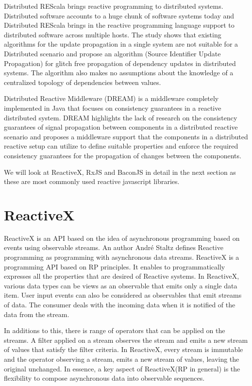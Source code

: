 Distributed REScala\cite{Drechsler:2014:DRU:2660193.2660240} brings reactive programming to distributed systems. Distributed software accounts to a huge chunk of software systems today and Distributed REScala brings in the reactive programming language support to distributed software across multiple hosts. The study\cite{Drechsler:2014:DRU:2660193.2660240} shows that existing algorithms for the update propagation in a single system are not suitable for a Distributed scenario and propose an algorithm (Source Identifier Update Propagation) for glitch free propagation of dependency updates in distributed systems. The algorithm also makes no assumptions about the knowledge of a centralized topology of dependencies between values.

Distributed Reactive Middleware (DREAM) \cite{Margara:2014:WDD:2611286.2611290} is a middleware completely implemented in Java that focuses on consistency guarantees in a reactive distributed system. DREAM highlights the lack of research on the consistency guarantees of signal propagation between components in a distributed reactive scenario and proposes a middleware support that the components in a distributed reactive setup can utilize to define suitable properties and enforce the required consistency guarantees for the propagation of changes between the components.

We will look at ReactiveX, RxJS and BaconJS in detail in the next section as these are most commonly used reactive javascript libraries.

\section{ReactiveX}
ReactiveX is an API based on the idea of asynchronous programming based on events using observable streams. An author André Staltz defines Reactive programming as programming with asynchronous data streams\cite{introToRP}. ReactiveX is a programming API based on RP principles. It enables to programmatically expresses \cite{Doblander:2015:GEA:2675743.2776757} all the properties that are desired of Reactive systems\cite{reactiveManifesto}. In ReactiveX, various data types can be views as an observable that emits only a single data item. User input events can also be considered as observables that emit streams of data. The consumer deals with the incoming data when it is notified of the data from the stream.

In additions to this, there is range of operators that can be applied on the streams. A filter applied on a stream observes the stream and emits a new stream of values that satisfy the filter criteria. In ReactiveX, every stream is immutable and the operator observing a stream, emits a new stream of values, leaving the original unchanged. In essence, a key aspect of ReactiveX(RP in general) is the flexibility to compose \cite{Meyerovich:2009:FPL:1639949.1640091} asynchronous data into observable sequences.

